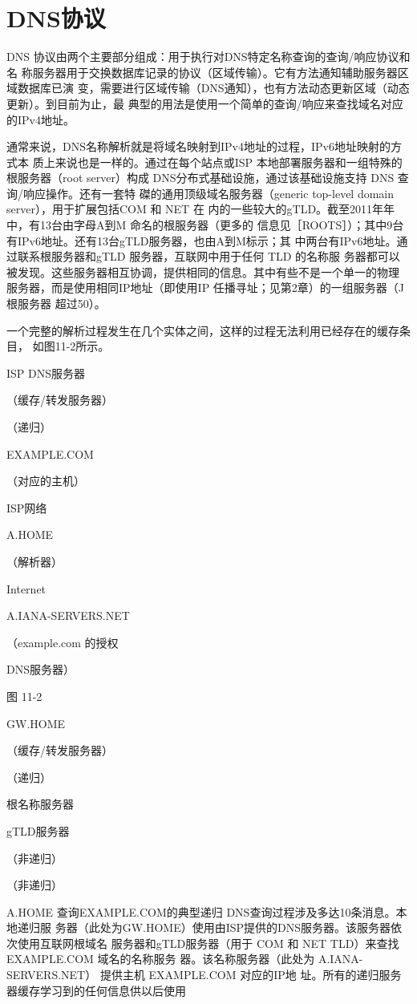 \section{DNS协议}

DNS 协议由两个主要部分组成：用于执行对DNS特定名称查询的查询/响应协议和名
称服务器用于交换数据库记录的协议（区域传输）。它有方法通知辅助服务器区域数据库已演
变，需要进行区域传输（DNS通知），也有方法动态更新区域（动态更新）。到目前为止，最
典型的用法是使用一个简单的查询/响应来查找域名对应的IPv4地址。

通常来说，DNS名称解析就是将域名映射到IPv4地址的过程，IPv6地址映射的方式本
质上来说也是一样的。通过在每个站点或ISP 本地部署服务器和一组特殊的根服务器（root
server）构成 DNS分布式基础设施，通过该基础设施支持 DNS 查询/响应操作。还有一套特
磔的通用顶级域名服务器（generic top-level domain server），用于扩展包括COM 和 NET 在
内的一些较大的gTLD。截至2011年年中，有13台由字母A到M 命名的根服务器（更多的
信息见［ROOTS］）；其中9台有IPv6地址。还有13台gTLD服务器，也由A到M标示；其
中两台有IPv6地址。通过联系根服务器和gTLD 服务器，互联网中用于任何 TLD 的名称服
务器都可以被发现。这些服务器相互协调，提供相同的信息。其中有些不是一个单一的物理
服务器，而是使用相同IP地址（即使用IP 任播寻址；见第2章）的一组服务器（J根服务器
超过50）。

一个完整的解析过程发生在几个实体之间，这样的过程无法利用已经存在的缓存条目，
如图11-2所示。

ISP DNS服务器

（缓存/转发服务器）

（递归）

EXAMPLE.COM

（对应的主机）

ISP网络

A.HOME

（解析器）

Internet

A.IANA-SERVERS.NET

（example.com 的授权

DNS服务器）

图 11-2

GW.HOME

（缓存/转发服务器）

（递归）

根名称服务器

gTLD服务器

（非递归）

（非递归）

A.HOME 查询EXAMPLE.COM的典型递归 DNS查询过程涉及多达10条消息。本地递归服
务器（此处为GW.HOME）使用由ISP提供的DNS服务器。该服务器依次使用互联网根域名
服务器和gTLD服务器（用于 COM 和 NET TLD）来查找EXAMPLE.COM 域名的名称服务
器。该名称服务器（此处为 A.IANA-SERVERS.NET） 提供主机 EXAMPLE.COM 对应的IP地
址。所有的递归服务器缓存学习到的任何信息供以后使用

